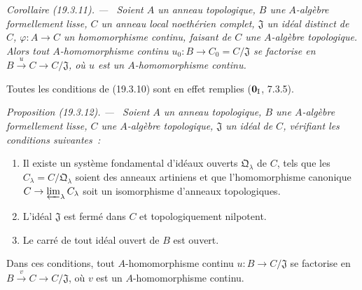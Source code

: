\documentclass[10pt,oneside]{book}
\makeatletter
\newcommand{\setmanualcurrentlabel}[1]{\def\@currentlabel{#1}}
\newenvironment{proposition}[1][]{%
  \setmanualcurrentlabel{#1}\par\medskip\noindent\itshape Proposition (#1). ---\ }{\par}
\newenvironment{corollary}[1][]{%
  \setmanualcurrentlabel{#1}\par\medskip\noindent\itshape Corollaire (#1). ---\ }{\par}
\makeatother
\begin{document}
\begin{corollary}[19.3.11]
\label{0.19.3.11-fr}
Soient $A$ un anneau topologique, $B$ une $A$-algèbre formellement lisse,
$C$ un anneau local noethérien complet, $\mathfrak J$ un idéal distinct de
$C$, $\varphi:A\to C$ un homomorphisme continu, faisant de $C$ une
$A$-algèbre topologique. Alors tout $A$-homomorphisme continu
$u_0:B\to C_0=C/\mathfrak J$ se factorise en
$B\xrightarrow{u}C\to C/\mathfrak J$, où $u$ est un $A$-homomorphisme
continu.
\end{corollary}

Toutes les conditions de (19.3.10) sont en effet remplies
($\mathbf 0_{\rm I}$, 7.3.5).

\begin{proposition}[19.3.12]
\label{0.19.3.12-fr}
Soient $A$ un anneau topologique, $B$ une $A$-algèbre formellement lisse,
$C$ une $A$-algèbre topologique, $\mathfrak J$ un idéal de $C$, vérifiant les
conditions suivantes~:
\begin{enumerate}
  \item[$1^\circ$] Il existe un système fondamental d'idéaux ouverts
  $\mathfrak Q_\lambda$ de $C$, tels que les
  $C_\lambda=C/\mathfrak Q_\lambda$ soient des anneaux artiniens et que
  l'homomorphisme canonique $C\to\varprojlim_\lambda C_\lambda$ soit un
  isomorphisme d'anneaux topologiques.
  \item[$2^\circ$] L'idéal $\mathfrak J$ est fermé dans $C$ et
  topologiquement nilpotent.
  \item[$3^\circ$] Le carré de tout idéal ouvert de $B$ est ouvert.
\end{enumerate}
Dans ces conditions, tout $A$-homomorphisme continu
$u:B\to C/\mathfrak J$ se factorise en
$B\xrightarrow{v}C\to C/\mathfrak J$, où $v$ est un $A$-homomorphisme
continu.
\end{proposition}
\end{document}
